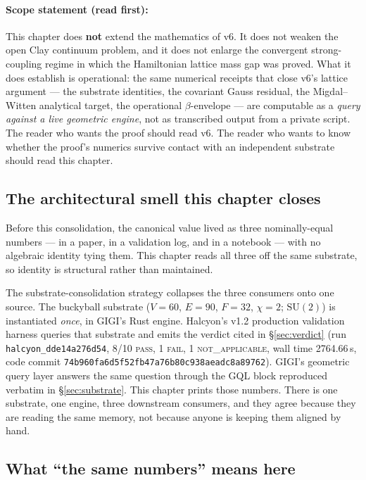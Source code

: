 \documentclass[12pt,a4paper]{article}
\theoremstyle{plain}
\theoremstyle{definition}
\theoremstyle{remark}
\begin{document}
\paragraph{Scope statement (read first):} This chapter does \textbf{not} extend the mathematics of v6. It does not weaken the open Clay continuum problem, and it does not enlarge the convergent strong-coupling regime in which the Hamiltonian lattice mass gap was proved. What it does establish is operational: the same numerical receipts that close v6's lattice argument --- the substrate identities, the covariant Gauss residual, the Migdal--Witten analytical target, the operational $\beta$-envelope --- are computable as a \emph{query against a live geometric engine}, not as transcribed output from a private script. The reader who wants the proof should read v6. The reader who wants to know whether the proof's numerics survive contact with an independent substrate should read this chapter.

\subsection{The architectural smell this chapter closes}

Before this consolidation, the canonical value lived as three nominally-equal numbers --- in a paper, in a validation log, and in a notebook --- with no algebraic identity tying them. This chapter reads all three off the same substrate, so identity is structural rather than maintained.

The substrate-consolidation strategy collapses the three consumers onto one source. The buckyball substrate ($V=60$, $E=90$, $F=32$, $\chi=2$; $\mathrm{SU}(2)$) is instantiated \emph{once}, in GIGI's Rust engine. Halcyon's v1.2 production validation harness queries that substrate and emits the verdict cited in \S\ref{sec:verdict} (run \texttt{halcyon\_dde14a276d54}, 8/10 \textsc{pass}, 1 \textsc{fail}, 1 \textsc{not\_applicable}, wall time 2764.66\,s, code commit \texttt{74b960fa6d5f52fb47a76b80c938aeadc8a89762}). GIGI's geometric query layer answers the same question through the GQL block reproduced verbatim in \S\ref{sec:substrate}. This chapter prints those numbers. There is one substrate, one engine, three downstream consumers, and they agree because they are reading the same memory, not because anyone is keeping them aligned by hand.

\subsection{What ``the same numbers'' means here}
\label{subsec:samenumbers}
\end{document}
